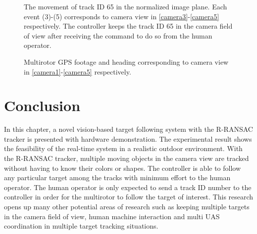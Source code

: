 \begin{figure}[htbp]
	\centering
	\caption[The movement of track ID 65 in the normalized image plane.]{The movement of track ID 65 in the normalized image plane. Each event (3)-(5) corresponds to camera view in \ref{camera3}-\ref{camera5} respectively. The controller keeps the track ID 65 in the camera field of view after receiving the command to do so from the human operator.}
	\label{image2}
\end{figure}

\begin{figure}[htbp]
	\centering
	\caption{Multirotor GPS footage and heading corresponding to camera view in \ref{camera1}-\ref{camera5} respectively.}
	\label{gps}
\end{figure}

\section{Conclusion}
In this chapter, a novel vision-based target following system with the R-RANSAC tracker is presented with hardware demonstration. The experimental result shows the feasibility of the real-time system in a realistic outdoor environment. With the R-RANSAC tracker, multiple moving objects in the camera view are tracked without having to know their colors or shapes. The controller is able to follow any particular target among the tracks with minimum effort to the human operator. The human operator is only expected to send a track ID number to the controller in order for the multirotor to follow the target of interest. This research opens up many other potential areas of research such as keeping multiple targets in the camera field of view, human machine interaction and multi UAS coordination in multiple target tracking situations.